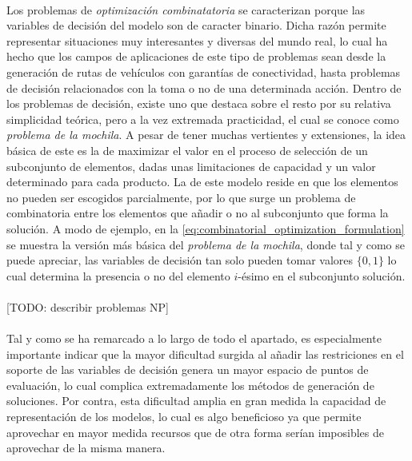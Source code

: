 \documentclass{subfiles}
\begin{document}
        \paragraph{}
        Los problemas de \emph{optimización combinatatoria} se caracterizan porque las variables de decisión del modelo son de caracter binario. Dicha razón permite representar situaciones muy interesantes y diversas del mundo real, lo cual ha hecho que los campos de aplicaciones de este tipo de problemas sean desde la generación de rutas de vehículos con garantías de conectividad, hasta problemas de decisión relacionados con la toma o no de una determinada acción. Dentro de los problemas de decisión, existe uno que destaca sobre el resto por su relativa simplicidad teórica, pero a la vez extremada practicidad, el cual se conoce como \emph{problema de la mochila}. A pesar de tener muchas vertientes y extensiones, la idea básica de este es la de maximizar el valor en el proceso de selección de un subconjunto de elementos, dadas unas limitaciones de capacidad y un valor determinado para cada producto. La  de este modelo reside en que los elementos no pueden ser escogidos parcialmente, por lo que surge un problema de combinatoria entre los elementos que añadir o no al subconjunto que forma la solución. A modo de ejemplo, en la \cref{eq:combinatorial_optimization_formulation} se muestra la versión más básica del \emph{problema de la mochila}, donde tal y como se puede apreciar, las variables de decisión tan solo pueden tomar valores $\{0, 1\}$ lo cual determina la presencia o no del elemento $i$-ésimo en el subconjunto solución.

        \paragraph{}
        [TODO: describir problemas NP]

        \paragraph{}
        Tal y como se ha remarcado a lo largo de todo el apartado, es especialmente importante indicar que la mayor dificultad surgida al añadir las restriciones en el soporte de las variables de decisión genera un mayor espacio de puntos de evaluación, lo cual complica extremadamente los métodos de generación de soluciones. Por contra, esta dificultad amplia en gran medida la capacidad de representación de los modelos, lo cual es algo beneficioso ya que permite aprovechar en mayor medida recursos que de otra forma serían imposibles de aprovechar de la misma manera.
\end{document}

